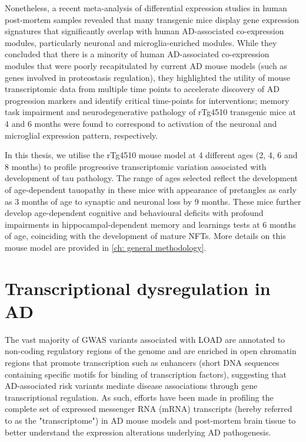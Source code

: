 Nonetheless, a recent meta-analysis of differential expression studies in human post-mortem samples revealed that many transgenic mice display gene expression signatures that significantly overlap with human AD-associated co-expression modules, particularly neuronal and microglia-enriched modules\cite{Wan2020}. While they concluded that there is a minority of human AD-associated co-expression modules that were poorly recapitulated by current AD mouse models (such as genes involved in proteostasis regulation), they highlighted the utility of mouse transcriptomic data from multiple time points to accelerate discovery of AD progression markers and identify critical time-points for interventions; memory task impairment and neurodegenerative pathology of rTg4510 transgenic mice at 4 and 6 months were found to correspond to activation of the neuronal and microglial expression pattern, respectively. 

In this thesis, we utilise the rTg4510 mouse model at 4 different ages (2, 4, 6 and 8 months) to profile progressive transcriptomic variation associated with development of tau pathology. The range of ages selected reflect the development of age-dependent tauopathy in these mice with appearance of pretangles as early as 3 months of age to synaptic and neuronal loss by 9 months. These mice further develop age-dependent cognitive and behavioural deficits with profound impairments in hippocampal-dependent memory and learnings tests at 6 months of age, coinciding with the development of mature NFTs\cite{Cook2014}. More details on this mouse model are provided in \cref{ch: general methodology}. 


\clearpage
\section{Transcriptional dysregulation in AD}

The vast majority of GWAS variants associated with LOAD are annotated to non-coding regulatory regions of the genome and are enriched in open chromatin regions that promote transcription such as enhancers\cite{Kikuchi2019} (short DNA sequences containing specific motifs for binding of transcription factors), suggesting that AD-associated risk variants mediate disease associations through gene transcriptional regulation. As such, efforts have been made in profiling the complete set of expressed messenger RNA (mRNA) transcripts (hereby referred to as the "transcriptome") in AD mouse models and post-mortem brain tissue to better understand the expression alterations underlying AD pathogenesis. 


